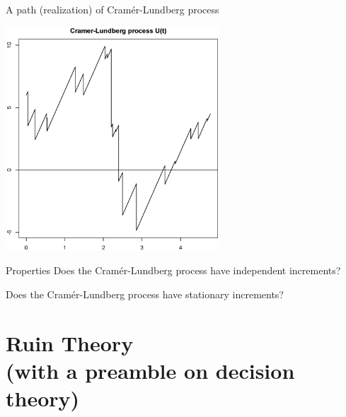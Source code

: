 \documentclass[11pt]{beamer}
\begin{document}
\begin{frame}{A path (realization) of Cram\'er-Lundberg   process}

\begin{center}
\includegraphics[width=0.6\textwidth,bb=0 0 495 511]{CLproc}
\end{center}

\end{frame}
\begin{frame}{Properties}
\vspace{-2 cm}
Does the Cram\'er-Lundberg   process have independent increments?

\vspace{3 cm}

Does the Cram\'er-Lundberg   process have stationary increments?


\end{frame}
\section{Ruin Theory \\ (with a preamble on decision theory)}
\end{document}
